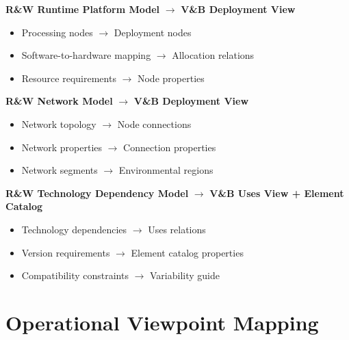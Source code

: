 \documentclass[11pt]{article}
\begin{document}
\begin{mappingbox}

\textbf{R\&W Runtime Platform Model} $\rightarrow$ \textbf{V\&B Deployment View}
\begin{itemize}[nosep]
    \item Processing nodes $\rightarrow$ Deployment nodes
    \item Software-to-hardware mapping $\rightarrow$ Allocation relations
    \item Resource requirements $\rightarrow$ Node properties
\end{itemize}

\textbf{R\&W Network Model} $\rightarrow$ \textbf{V\&B Deployment View}
\begin{itemize}[nosep]
    \item Network topology $\rightarrow$ Node connections
    \item Network properties $\rightarrow$ Connection properties
    \item Network segments $\rightarrow$ Environmental regions
\end{itemize}

\textbf{R\&W Technology Dependency Model} $\rightarrow$ \textbf{V\&B Uses View + Element Catalog}
\begin{itemize}[nosep]
    \item Technology dependencies $\rightarrow$ Uses relations
    \item Version requirements $\rightarrow$ Element catalog properties
    \item Compatibility constraints $\rightarrow$ Variability guide
\end{itemize}
\end{mappingbox}

\section{Operational Viewpoint Mapping}
\end{document}
